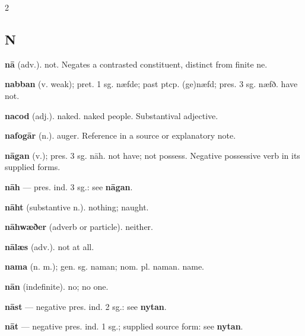 \begin{multicols*}{2}
\subsection*{N}
\textbf{nā} (adv.). not. Negates a contrasted constituent, distinct from finite ne.\par
\textbf{nabban} (v. weak); pret. 1 sg. næfde; past ptcp. (ge)næfd; pres. 3 sg. næfð. have not.\par
\textbf{nacod} (adj.). naked. naked people. Substantival adjective.\par
\textbf{nafogār} (n.). auger. Reference in a source or explanatory note.\par
\textbf{nāgan} (v.); pres. 3 sg. nāh. not have; not possess. Negative possessive verb in its supplied forms.\par
\textbf{nāh} — pres. ind. 3 sg.: see \textbf{nāgan}.\par
\textbf{nāht} (substantive n.). nothing; naught.\par
\textbf{nāhwæðer} (adverb or particle). neither.\par
\textbf{nālæs} (adv.). not at all.\par
\textbf{nama} (n. m.); gen. sg. naman; nom. pl. naman. name.\par
\textbf{nān} (indefinite). no; no one.\par
\textbf{nāst} — negative pres. ind. 2 sg.: see \textbf{nytan}.\par
\textbf{nāt} — negative pres. ind. 1 sg.; supplied source form: see \textbf{nytan}.\par

\end{multicols*}
